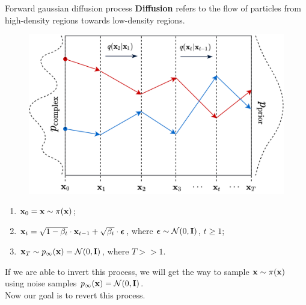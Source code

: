 \begin{frame}{Forward gaussian diffusion process}
	\textbf{Diffusion} refers to the flow of particles from high-density regions towards low-density regions.
	\vspace{-0.2cm}
	\begin{figure}
		\includegraphics[width=0.5\linewidth]{figs/diffusion_over_time}
	\end{figure}
	\vspace{-0.6cm}
	\begin{enumerate}
		\item $\mathbf{x}_0 = \mathbf{x} \sim \pi(\mathbf{x})$;
		\item $\mathbf{x}_t = \sqrt{1 - \beta_t} \cdot \mathbf{x}_{t - 1} + \sqrt{\beta_t} \cdot \boldsymbol{\epsilon}$, where $\boldsymbol{\epsilon} \sim \mathcal{N}(0, \mathbf{I})$, $t \geq 1$;
		\item $\mathbf{x}_T \sim p_{\infty}(\mathbf{x}) = \mathcal{N}(0, \mathbf{I})$, where $T >> 1$.
	\end{enumerate}
	If we are able to invert this process, we will get the way to sample $\mathbf{x} \sim \pi(\mathbf{x})$ using noise samples $p_{\infty}(\mathbf{x}) = \mathcal{N}(0, \mathbf{I})$. \\ 
	Now our goal is to revert this process.
\end{frame}
